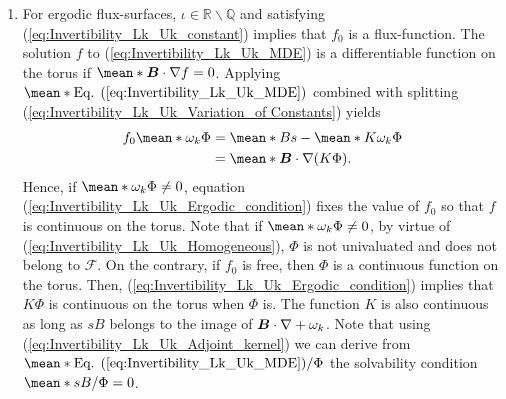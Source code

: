 \documentclass[10pt]{iopart}
\begin{document}
\begin{enumerate}
	\item For ergodic flux-surfaces, $\iota\in\mathbb{R}\backslash \mathbb{Q}$ and satisfying (\ref{eq:Invertibility_Lk_Uk_constant}) implies that $f_0$ is a flux-function. The solution $f$ to (\ref{eq:Invertibility_Lk_Uk_MDE}) is a differentiable function on the torus if $\mean*{\vb*{B}\cdot\nabla f} = 0$. Applying $\mean*{\text{Eq. (\ref{eq:Invertibility_Lk_Uk_MDE})}}$ combined with splitting (\ref{eq:Invertibility_Lk_Uk_Variation_of Constants}) yields
	\begin{align}
		f_0\mean*{\omega_k \Phi}  & = \mean*{B s} - \mean*{K \omega_k \Phi} \nonumber
		\\
		& = \mean*{\vb*{B}\cdot\nabla(K \Phi)}. \label{eq:Invertibility_Lk_Uk_Ergodic_condition}
	\end{align}
	Hence, if $\mean*{\omega_k \Phi} \ne 0$, equation (\ref{eq:Invertibility_Lk_Uk_Ergodic_condition}) fixes the value of $f_0$ so that $f$ is continuous on the torus. Note that if $\mean*{\omega_k \Phi} \ne 0$, by virtue of (\ref{eq:Invertibility_Lk_Uk_Homogeneous}), $\Phi$ is not univaluated and does not belong to $\mathcal{F}$. On the contrary, if $f_0$ is free, then $\Phi$ is a continuous function on the torus. Then, (\ref{eq:Invertibility_Lk_Uk_Ergodic_condition}) implies that $K\Phi$ is continuous on the torus when $\Phi$ is. The function $K$ is also continuous as long as $sB$ belongs to the image of $\vb*{B}\cdot \nabla + \omega_k$. Note that using (\ref{eq:Invertibility_Lk_Uk_Adjoint_kernel}) we can derive from $\mean*{\text{Eq. (\ref{eq:Invertibility_Lk_Uk_MDE})}/\Phi}$ the solvability condition $\mean*{sB/\Phi}=0$.
	

\end{enumerate}
\end{document}
